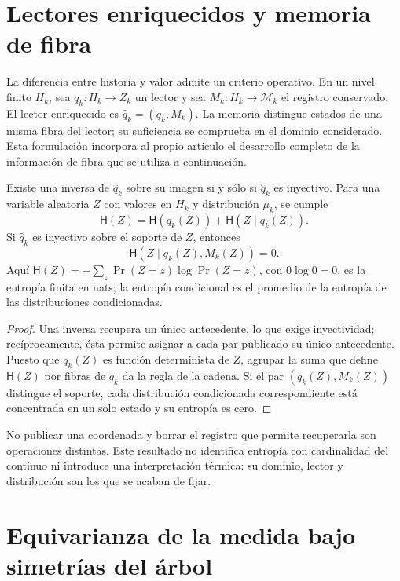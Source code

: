 \section{Lectores enriquecidos y memoria de fibra}
\label{x_reciprocidad:sec:ch-memoria-fibra}

La diferencia entre historia y valor admite un criterio operativo. En un
nivel finito \(H_k\), sea \(q_k:H_k\to Z_k\) un lector y sea
\(M_k:H_k\to\mathcal M_k\) el registro conservado. El lector enriquecido
es \(\widehat q_k=(q_k,M_k)\). La memoria distingue estados de una misma
fibra del lector; su suficiencia se comprueba en el dominio considerado.
Esta formulación incorpora al propio artículo el desarrollo completo de la
información de fibra que se utiliza a continuación.

\begin{proposition}
\label{x_reciprocidad:prop:ch-recuperabilidad-fibra}
Existe una inversa de \(\widehat q_k\) sobre su imagen si y sólo si
\(\widehat q_k\) es inyectivo. Para una variable aleatoria \(Z\) con
valores en \(H_k\) y distribución \(\mu_k\), se cumple
\[
 \mathsf H(Z)=\mathsf H(q_k(Z))+\mathsf H(Z\mid q_k(Z)).
\]
Si \(\widehat q_k\) es inyectivo sobre el soporte de \(Z\), entonces
\[
 \mathsf H(Z\mid q_k(Z),M_k(Z))=0.
\]
Aquí \(\mathsf H(Z)=-\sum_z\Pr(Z=z)\log\Pr(Z=z)\), con
\(0\log0=0\), es la entropía finita en nats; la entropía condicional es
el promedio de la entropía de las distribuciones condicionadas.
\end{proposition}

\begin{proof}
Una inversa recupera un único antecedente, lo que exige inyectividad;
recíprocamente, ésta permite asignar a cada par publicado su único
antecedente. Puesto que \(q_k(Z)\) es función determinista de \(Z\),
agrupar la suma que define \(\mathsf H(Z)\) por fibras de \(q_k\) da la
regla de la cadena. Si el par \((q_k(Z),M_k(Z))\) distingue el soporte,
cada distribución condicionada correspondiente está concentrada en un solo
estado y su entropía es cero.
\end{proof}

No publicar una coordenada y borrar el registro que permite recuperarla son
operaciones distintas. Este resultado no identifica entropía con cardinalidad
del continuo ni introduce una interpretación térmica: su dominio, lector y
distribución son los que se acaban de fijar.

\section{Equivarianza de la medida bajo simetrías del árbol}
\label{x_reciprocidad:sec:ch-naturalidad-medida}

